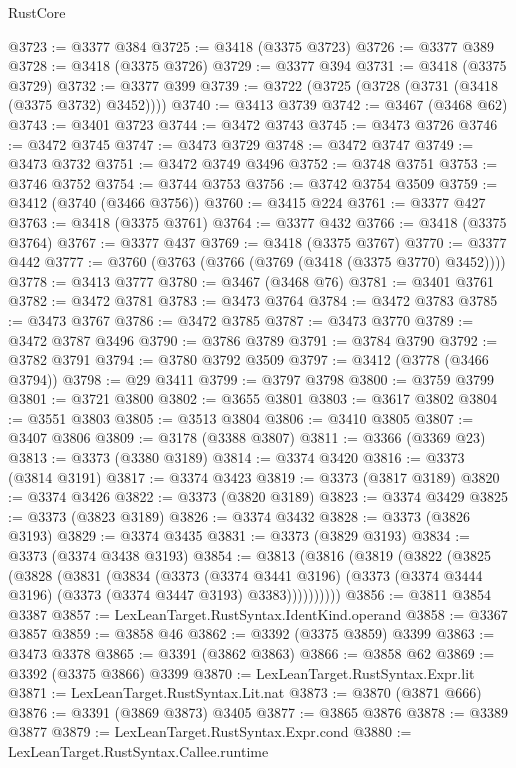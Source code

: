\begin{lexlean}{RustCore}
\begin{coremodule}
@3723 := @3377 @384
@3725 := @3418 (@3375 @3723)
@3726 := @3377 @389
@3728 := @3418 (@3375 @3726)
@3729 := @3377 @394
@3731 := @3418 (@3375 @3729)
@3732 := @3377 @399
@3739 := @3722 (@3725 (@3728 (@3731 (@3418 (@3375 @3732) @3452))))
@3740 := @3413 @3739
@3742 := @3467 (@3468 @62)
@3743 := @3401 @3723
@3744 := @3472 @3743
@3745 := @3473 @3726
@3746 := @3472 @3745
@3747 := @3473 @3729
@3748 := @3472 @3747
@3749 := @3473 @3732
@3751 := @3472 @3749 @3496
@3752 := @3748 @3751
@3753 := @3746 @3752
@3754 := @3744 @3753
@3756 := @3742 @3754 @3509
@3759 := @3412 (@3740 (@3466 @3756))
@3760 := @3415 @224
@3761 := @3377 @427
@3763 := @3418 (@3375 @3761)
@3764 := @3377 @432
@3766 := @3418 (@3375 @3764)
@3767 := @3377 @437
@3769 := @3418 (@3375 @3767)
@3770 := @3377 @442
@3777 := @3760 (@3763 (@3766 (@3769 (@3418 (@3375 @3770) @3452))))
@3778 := @3413 @3777
@3780 := @3467 (@3468 @76)
@3781 := @3401 @3761
@3782 := @3472 @3781
@3783 := @3473 @3764
@3784 := @3472 @3783
@3785 := @3473 @3767
@3786 := @3472 @3785
@3787 := @3473 @3770
@3789 := @3472 @3787 @3496
@3790 := @3786 @3789
@3791 := @3784 @3790
@3792 := @3782 @3791
@3794 := @3780 @3792 @3509
@3797 := @3412 (@3778 (@3466 @3794))
@3798 := @29 @3411
@3799 := @3797 @3798
@3800 := @3759 @3799
@3801 := @3721 @3800
@3802 := @3655 @3801
@3803 := @3617 @3802
@3804 := @3551 @3803
@3805 := @3513 @3804
@3806 := @3410 @3805
@3807 := @3407 @3806
@3809 := @3178 (@3388 @3807)
@3811 := @3366 (@3369 @23)
@3813 := @3373 (@3380 @3189)
@3814 := @3374 @3420
@3816 := @3373 (@3814 @3191)
@3817 := @3374 @3423
@3819 := @3373 (@3817 @3189)
@3820 := @3374 @3426
@3822 := @3373 (@3820 @3189)
@3823 := @3374 @3429
@3825 := @3373 (@3823 @3189)
@3826 := @3374 @3432
@3828 := @3373 (@3826 @3193)
@3829 := @3374 @3435
@3831 := @3373 (@3829 @3193)
@3834 := @3373 (@3374 @3438 @3193)
@3854 := @3813
    (@3816
      (@3819
        (@3822
          (@3825
            (@3828
              (@3831
                (@3834
                  (@3373
                    (@3374 @3441 @3196)
                    (@3373 (@3374 @3444 @3196) (@3373 (@3374 @3447 @3193) @3383))))))))))
@3856 := @3811 @3854 @3387
@3857 := LexLeanTarget.RustSyntax.IdentKind.operand
@3858 := @3367 @3857
@3859 := @3858 @46
@3862 := @3392 (@3375 @3859) @3399
@3863 := @3473 @3378
@3865 := @3391 (@3862 @3863)
@3866 := @3858 @62
@3869 := @3392 (@3375 @3866) @3399
@3870 := LexLeanTarget.RustSyntax.Expr.lit
@3871 := LexLeanTarget.RustSyntax.Lit.nat
@3873 := @3870 (@3871 @666)
@3876 := @3391 (@3869 @3873) @3405
@3877 := @3865 @3876
@3878 := @3389 @3877
@3879 := LexLeanTarget.RustSyntax.Expr.cond
@3880 := LexLeanTarget.RustSyntax.Callee.runtime

\end{coremodule}
\end{lexlean}

